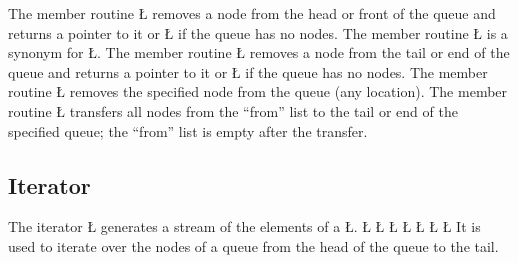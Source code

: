 \documentclass[openright,twoside]{report}
\begin{document}
The member routine \LGinlinetrue\LGbegin\lgrinde\L{}\endlgrinde\LGend{} removes a node from the head or front of the queue and returns a pointer to it or \LGinlinetrue\LGbegin\lgrinde\L{}\endlgrinde\LGend{} if the queue has no nodes.
The member routine \LGinlinetrue\LGbegin\lgrinde\L{}\endlgrinde\LGend{} is a synonym for \LGinlinetrue\LGbegin\lgrinde\L{}\endlgrinde\LGend{}.
The member routine \LGinlinetrue\LGbegin\lgrinde\L{}\endlgrinde\LGend{} removes a node from the tail or end of the queue and returns a pointer to it or \LGinlinetrue\LGbegin\lgrinde\L{}\endlgrinde\LGend{} if the queue has no nodes.
The member routine \LGinlinetrue\LGbegin\lgrinde\L{}\endlgrinde\LGend{} removes the specified node from the queue (any location).
The member routine \LGinlinetrue\LGbegin\lgrinde\L{}\endlgrinde\LGend{} transfers all nodes from the ``from'' list to the tail or end of the specified queue;
the ``from'' list is empty after the transfer.


\subsection{Iterator}

The iterator \LGinlinetrue\LGbegin\lgrinde\L{}\endlgrinde\LGend{} generates a stream of the elements of a \LGinlinetrue\LGbegin\lgrinde\L{}\endlgrinde\LGend{}.
\LGinlinefalse\LGbegin\lgrinde
\L{}
\L{}
\L{\LB{}}
\L{\LB{}}
\L{\LB{}}
\L{\LB{}}
\L{\LB{\};}}
\endlgrinde\LGend
{}%
%
It is used to iterate over the nodes of a queue from the head of the queue to the tail.
\end{document}
